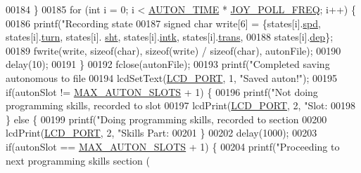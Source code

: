 \begin{DoxyCode}
{{{{{{{{{{{{{{{{{00184     \}
00185     \textcolor{keywordflow}{for} (\textcolor{keywordtype}{int} i = 0; i < \hyperlink{autonrecorder_8h_aa19f7c427989a0a67f55958c610d0355}{AUTON\_TIME} * \hyperlink{autonrecorder_8h_a3d2260a30e7ce727bef0402edee4b205}{JOY\_POLL\_FREQ}; i++) \{
00186         printf(\textcolor{stringliteral}{"Recording state %
00187         \textcolor{keywordtype}{signed} \textcolor{keywordtype}{char} write[6] = \{states[i].\hyperlink{structjoy_state_a7867156ddb5bc22d57010c5af00c98af}{spd}, states[i].\hyperlink{structjoy_state_aacdbb758b97190220423402f63020483}{turn}, states[i].
      \hyperlink{structjoy_state_a751363be4e40b27bcbe558f41a15fe91}{sht}, states[i].\hyperlink{structjoy_state_a2314ed43be31ccc565381efd8398b921}{intk}, states[i].\hyperlink{structjoy_state_acc4f7bae078e8c8b7840cda61382c7cf}{trans},
00188                                 states[i].\hyperlink{structjoy_state_a3ba5ee3c4eec0e2ee03338b397a17958}{dep}\};
00189         fwrite(write, \textcolor{keyword}{sizeof}(\textcolor{keywordtype}{char}), \textcolor{keyword}{sizeof}(write) / \textcolor{keyword}{sizeof}(\textcolor{keywordtype}{char}), autonFile);
00190         delay(10);
00191     \}
00192     fclose(autonFile);
00193     printf(\textcolor{stringliteral}{"Completed saving autonomous to file %
00194     lcdSetText(\hyperlink{lcdmsg_8h_abcf42bd88b3c36193f301ca25b033875}{LCD\_PORT}, 1, \textcolor{stringliteral}{"Saved auton!"});
00195     \textcolor{keywordflow}{if}(autonSlot != \hyperlink{autonrecorder_8h_a5173a11a545cb4020fdd139552dc15c1}{MAX\_AUTON\_SLOTS} + 1) \{
00196         printf(\textcolor{stringliteral}{"Not doing programming skills, recorded to slot %
00197         lcdPrint(\hyperlink{lcdmsg_8h_abcf42bd88b3c36193f301ca25b033875}{LCD\_PORT}, 2, \textcolor{stringliteral}{"Slot: %
00198     \} \textcolor{keywordflow}{else} \{
00199         printf(\textcolor{stringliteral}{"Doing programming skills, recorded to section %
00200         lcdPrint(\hyperlink{lcdmsg_8h_abcf42bd88b3c36193f301ca25b033875}{LCD\_PORT}, 2, \textcolor{stringliteral}{"Skills Part: %
00201     \}
00202     delay(1000);
00203     \textcolor{keywordflow}{if}(autonSlot == \hyperlink{autonrecorder_8h_a5173a11a545cb4020fdd139552dc15c1}{MAX\_AUTON\_SLOTS} + 1) \{
00204         printf(\textcolor{stringliteral}{"Proceeding to next programming skills section (%
}}}}}}}}}}}}}}}}}}}}}}}}
\end{DoxyCode}
